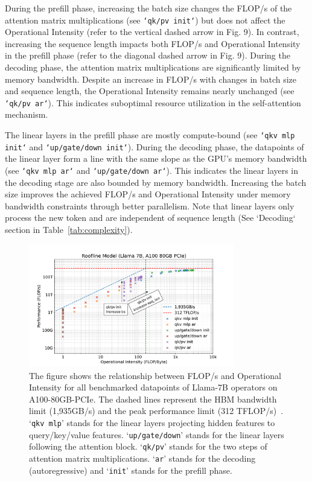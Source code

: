 \documentclass{article}
\theoremstyle{plain}
\theoremstyle{definition}
\theoremstyle{remark}
\begin{document}
During the prefill phase, increasing the batch size changes the FLOP/s of the attention matrix multiplications (see \texttt{`qk/pv init`}) but does not affect the Operational Intensity (refer to the vertical dashed arrow in Fig. 9). 
In contrast, increasing the sequence length impacts both FLOP/s and Operational Intensity in the prefill phase (refer to the diagonal dashed arrow in Fig. 9).
During the decoding phase, the attention matrix multiplications are significantly limited by memory bandwidth. Despite an increase in FLOP/s with changes in batch size and sequence length, the Operational Intensity remains nearly unchanged (see \texttt{`qk/pv ar`}). This indicates suboptimal resource utilization in the self-attention mechanism.

The linear layers in the prefill phase are mostly compute-bound (see \texttt{`qkv mlp init`} and \texttt{`up/gate/down init`}). During the decoding phase, the datapoints of the linear layer form a line with the same slope as the GPU’s memory bandwidth (see \texttt{`qkv mlp ar`} and \texttt{`up/gate/down ar`}). This indicates the linear layers in the decoding stage are also bounded by memory bandwidth. Increasing the batch size improves the achieved FLOP/s and Operational Intensity under memory bandwidth constraints through better parallelism. Note that linear layers only process the new token and are independent of sequence length (See `Decoding` section in Table~\ref{tab:complexity}).

\begin{figure}[h]
    \centering
    \includegraphics[width=0.8\textwidth]{llama7b-roofline-a100.pdf}
    \caption{The figure shows the relationship between FLOP/s and Operational Intensity for all benchmarked datapoints of Llama-7B operators on A100-80GB-PCIe. The dashed lines represent the HBM bandwidth limit (1,935GB/s) and the peak performance limit (312 TFLOP/s)~\cite{nvidia_a100_datasheet}. `\texttt{qkv mlp}' stands for the linear layers projecting hidden features to query/key/value features. `\texttt{up/gate/down}' stands for the linear layers following the attention block. `\texttt{qk/pv}' stands for the two steps of attention matrix multiplications. `\texttt{ar}' stands for the decoding (autoregressive) and `\texttt{init}' stands for the prefill phase.}
    \label{fig:llama7b-roofline-a100}
\end{figure}
\end{document}
